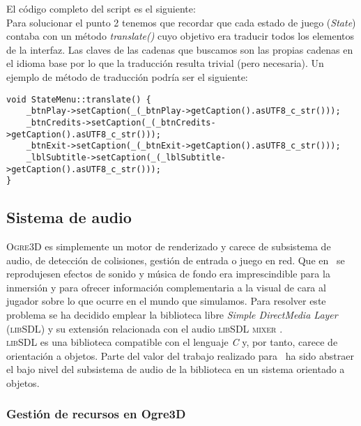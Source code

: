 El código completo del script es el siguiente:\\



Para solucionar el punto 2 tenemos que recordar que cada estado de juego
(\textit{State}) contaba con un método \textit{translate()} cuyo objetivo
era traducir todos los elementos de la interfaz. Las claves de las cadenas
que buscamos son las propias cadenas en el idioma base por lo que la traducción
resulta trivial (pero necesaria). Un ejemplo de método de traducción podría
ser el siguiente:\\

\begin{lstlisting}[style=C++]
void StateMenu::translate() {
    _btnPlay->setCaption(_(_btnPlay->getCaption().asUTF8_c_str()));
    _btnCredits->setCaption(_(_btnCredits->getCaption().asUTF8_c_str()));
    _btnExit->setCaption(_(_btnExit->getCaption().asUTF8_c_str()));
    _lblSubtitle->setCaption(_(_lblSubtitle->getCaption().asUTF8_c_str()));
}
\end{lstlisting}


\subsection{Sistema de audio}

\textsc{Ogre3D} es simplemente un motor de renderizado y carece de subsistema
de audio, de detección de colisiones, gestión de entrada o juego en red.
Que en \juego\ se reprodujesen efectos de sonido y música de fondo era
imprescindible para la inmersión y para ofrecer información complementaria
a la visual de cara al jugador sobre lo que ocurre en el mundo que simulamos.
Para resolver este problema se ha decidido emplear la biblioteca libre
\textit{Simple DirectMedia Layer} (\textsc{libSDL}) y su extensión
relacionada con el audio \textsc{libSDL mixer} \cite{website:sdl}.\\

\textsc{libSDL} es una biblioteca compatible con el lenguaje \textit{C} y,
por tanto, carece de orientación a objetos. Parte del valor del trabajo
realizado para \juego\ ha sido abstraer el bajo nivel del subsistema de audio
de la biblioteca en un sistema orientado a objetos.\\

\subsubsection{Gestión de recursos en Ogre3D}

